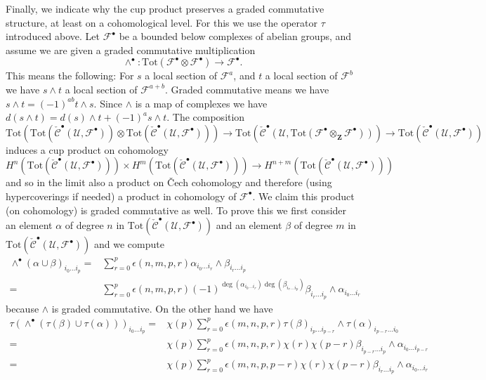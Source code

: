 \medskip\noindent
Finally, we indicate why the cup product preserves a graded commutative
structure, at least on a cohomological level. For this we use the operator
$\tau$ introduced above. Let ${\mathcal F}^\bullet$ be a bounded below
complexes of abelian groups, and assume we are given a graded commutative
multiplication
$$
\wedge^\bullet :
\text{Tot}({\mathcal F}^\bullet\otimes {\mathcal F}^\bullet)
\longrightarrow
{\mathcal F}^\bullet.
$$
This means the following: For $s$ a local section of
${\mathcal F}^a$, and $t$ a local section of ${\mathcal F}^b$
we have $s \wedge t$ a local section of ${\mathcal F}^{a + b}$.
Graded commutative means we have
$s \wedge t = (-1)^{ab} t \wedge s$. Since $\wedge$ is a map
of complexes we have
$d(s\wedge t) = d(s) \wedge t + (-1)^a s \wedge t$.
The composition
$$
\text{Tot}(
\text{Tot}(\check{\mathcal{C}}^\bullet({\mathcal U}, {\mathcal F}^\bullet))
\otimes
\text{Tot}(\check{\mathcal{C}}^\bullet({\mathcal U}, {\mathcal F}^\bullet))
)
\to
\text{Tot}(
\check{\mathcal{C}}^\bullet({\mathcal U},
\text{Tot}({\mathcal F}^\bullet\otimes_{\mathbf Z}{\mathcal F}^\bullet))
)
\to
\text{Tot}(\check{\mathcal{C}}^\bullet({\mathcal U}, {\mathcal F}^\bullet))
$$
induces a cup product on cohomology
$$
H^n(
\text{Tot}(\check{\mathcal{C}}^\bullet({\mathcal U}, {\mathcal F}^\bullet))
)
\times
H^m(
\text{Tot}(\check{\mathcal{C}}^\bullet({\mathcal U}, {\mathcal F}^\bullet))
)
\longrightarrow
H^{n + m}(
\text{Tot}(\check{\mathcal{C}}^\bullet({\mathcal U}, {\mathcal F}^\bullet))
)
$$
and so in the limit also a product on {\v C}ech cohomology
and therefore (using hypercoverings if needed) a product
in cohomology of ${\mathcal F}^\bullet$. We claim this product
(on cohomology) is graded commutative as well. To prove this
we first consider an element $\alpha$ of degree $n$ in
$\text{Tot}(\check{\mathcal{C}}^\bullet({\mathcal U}, {\mathcal F}^\bullet))$
and an element $\beta$ of degree $m$ in
$\text{Tot}(\check{\mathcal{C}}^\bullet({\mathcal U}, {\mathcal F}^\bullet))$
and we compute
\begin{align*}
\wedge^\bullet(\alpha \cup \beta)_{i_0 \ldots i_p}
= &
\sum\nolimits_{r = 0}^p
\epsilon(n, m, p, r)
\alpha_{i_0 \ldots i_r} \wedge \beta_{i_r \ldots i_p} \\
= &
\sum\nolimits_{r = 0}^p
\epsilon(n, m, p, r)
(-1)^{\deg(\alpha_{i_0 \ldots i_r})\deg(\beta_{i_r \ldots i_p})}
\beta_{i_r \ldots i_p} \wedge \alpha_{i_0 \ldots i_r}
\end{align*}
because $\wedge$ is graded commutative. On the other hand we have
\begin{align*}
\tau(\wedge^\bullet(\tau(\beta) \cup \tau(\alpha)))_{i_0 \ldots i_p}
= &
\chi(p)
\sum\nolimits_{r = 0}^p
\epsilon(m, n, p, r)
\tau(\beta)_{i_p \ldots i_{p - r}} \wedge \tau(\alpha)_{i_{p - r} \ldots i_0}
\\
= &
\chi(p)
\sum\nolimits_{r = 0}^p
\epsilon(m, n, p, r) \chi(r) \chi(p - r)
\beta_{i_{p - r} \ldots i_p} \wedge \alpha_{i_0 \ldots i_{p - r}}
\\
= &
\chi(p)
\sum\nolimits_{r = 0}^p
\epsilon(m, n, p, p - r) \chi(r) \chi(p - r)
\beta_{i_r \ldots i_p} \wedge \alpha_{i_0 \ldots i_r}
\end{align*}
